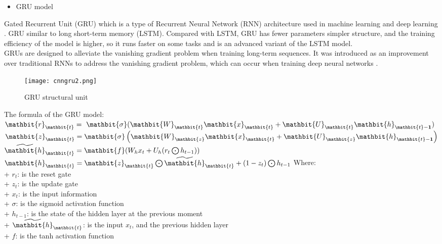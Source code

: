 \documentclass{ieeeojies}
\begin{document}
{\begin{flushleft}
\begin{itemize}
    \item GRU model
\end{itemize}
\hspace{0.4cm}Gated Recurrent Unit (GRU) which is a type of Recurrent Neural Network (RNN) architecture used in machine learning and deep learning \cite{cnngru1&lstm1}. GRU similar to long short-term memory (LSTM). Compared with LSTM, GRU has fewer parameters simpler structure, and the training efficiency of the model is higher, so it runs faster on some tasks and is an advanced variant of the LSTM model.\\
\hspace{0.4cm}GRUs are designed to alleviate the vanishing gradient problem when training long-term sequences. It was introduced as an improvement over traditional RNNs to address the vanishing gradient problem, which can occur when training deep neural networks \cite{cnngru1&lstm1}.
\begin{figure}[H]
    \centering
    \texttt{[image: cnngru2.png]}
    \caption{\centering GRU structural unit}
    \label{fig:enter-label}
\end{figure}

The formula of the GRU model:\\
$\mathbit{r}_\mathbit{t}=\ \mathbit{\sigma}(\mathbit{W}_\mathbit{t}\mathbit{x}_\mathbit{t}+\mathbit{U}_\mathbit{t}\mathbit{h}_{\mathbit{t}-\mathbf{1}})$ \\

$\mathbit{z}_\mathbit{t}=\mathbit{\sigma}\left(\mathbit{W}_\mathbit{z}\mathbit{x}_\mathbit{t}+\mathbit{U}_\mathbit{z}\mathbit{h}_{\mathbit{t}-\mathbf{1}}\right)$\\

${\widetilde{\mathbit{h}}}_\mathbit{t}=\mathbit{f}(W_hx_t+U_h(r_t\bigodot h_{t-1})) $\\

$\mathbit{h}_\mathbit{t}=\mathbit{z}_\mathbit{t}\bigodot \widetilde{\mathbit{h}}_\mathbit{t}+(1-z_t)\bigodot h_{t-1}$  \newline
Where:\\
+ $r_t$: is the reset gate\\
+ $z_t$: is the update gate \\
+ $x_t$: is the input information\\
+ $\sigma$: is the sigmoid activation function\\
+ $h_{t−1}$: is the state of the hidden layer at the previous moment\\
+ $\widetilde{\mathbit{h}}_\mathbit{t}$: is the input $x_t$, and the previous hidden layer\\
+ $f$: is the tanh activation function\\


\end{flushleft}}
\end{document}

